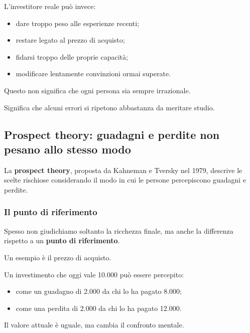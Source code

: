 \noindent L'investitore reale può invece:

\begin{itemize}
    \item dare troppo peso
    alle esperienze recenti;

    \item restare legato
    al prezzo di acquisto;

    \item fidarsi troppo
    delle proprie capacità;

    \item modificare lentamente
    convinzioni ormai superate.
\end{itemize}

\noindent Questo non significa
che ogni persona sia sempre irrazionale.

\noindent Significa che alcuni errori
si ripetono abbastanza
da meritare studio.


\subsection{Prospect theory:
guadagni e perdite non pesano allo stesso modo}

\noindent La \textbf{prospect theory},
proposta da Kahneman e Tversky nel 1979,
descrive le scelte rischiose
considerando il modo in cui le persone
percepiscono guadagni e perdite.


\subsubsection*{Il punto di riferimento}

\noindent Spesso non giudichiamo soltanto
la ricchezza finale,
ma anche la differenza rispetto
a un \textbf{punto di riferimento}.

\noindent Un esempio è il prezzo di acquisto.

\medskip

\noindent Un investimento che oggi vale 10.000
può essere percepito:

\begin{itemize}
    \item come un guadagno di 2.000
    da chi lo ha pagato 8.000;

    \item come una perdita di 2.000
    da chi lo ha pagato 12.000.
\end{itemize}

\noindent Il valore attuale è uguale,
ma cambia il confronto mentale.


